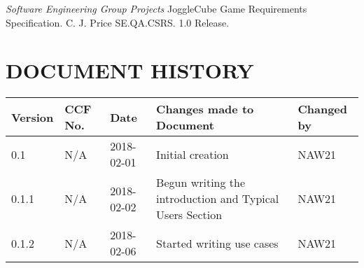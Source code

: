 \documentclass{project}
\begin{document}
\clearpage
{}
\begin{thebibliography}{5}
 \emph{Software Engineering Group Projects}
JoggleCube Game Requirements Specification.
C. J. Price SE.QA.CSRS. 1.0 Release.
\end{thebibliography}
\clearpage
{}
\section*{DOCUMENT HISTORY}
\begin{tabular}{|l | l | l | l | l |}
\hline
Version & CCF No. & Date & Changes made to Document & Changed by \\
\hline
0.1 & N/A & 2018-02-01 & Initial creation & NAW21 \\
\hline
0.1.1 & N/A & 2018-02-02 & Begun writing the introduction and Typical Users Section & NAW21 \\
\hline
0.1.2 & N/A & 2018-02-06 & Started writing use cases & NAW21 \\
\hline
\end{tabular}
\label{thelastpage}
\end{document}

